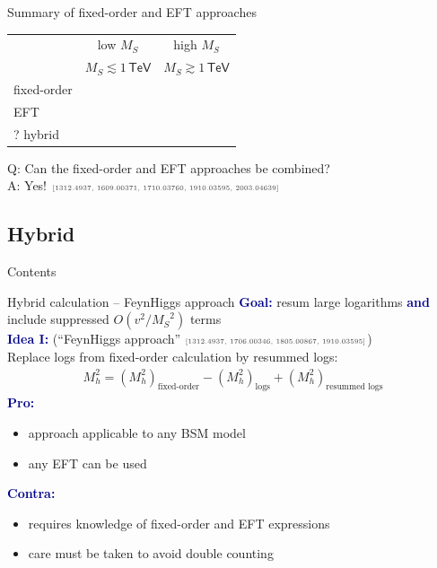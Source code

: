 \documentclass[hyperref={pdfpagelabels=false},ngerman]{beamer}
\newcommand{\cmark}{\ding{51}}%
\newcommand{\xmark}{\ding{55}}%
\newcommand{\eh}[1]{\,\mathsf{#1}}
\newcommand{\ok}{\textcolor{darkgreen}{\cmark}}
\newcommand{\notok}{\textcolor{red}{\xmark}}
\newcommand{\MS}{\ensuremath{M_S}}
\newcommand{\mycite}[1]{\ensuremath{\text{\textcolor{darkgray}{\tiny [#1]}}}}
\renewcommand{\emph}[1]{\textbf{\textcolor{darkblue}{#1}}}
\begin{document}
\begin{frame}{Summary of fixed-order and EFT approaches}
  \begin{center}
    \begin{tabular}{lcc}
      \toprule
                  & low $\MS$ & high $\MS$ \\
                  & $\MS \lesssim 1\eh{TeV}$ & $\MS \gtrsim 1\eh{TeV}$ \\
      \midrule
      fixed-order & \ok       & \notok     \\
      EFT         & \notok    & \ok        \\
      ? hybrid    & \ok       & \ok        \\
      \bottomrule
    \end{tabular}
  \end{center}
  \vspace{2em}
  Q: Can the fixed-order and EFT approaches be combined? \\[1em]
  A: Yes!  \mycite{1312.4937, 1609.00371, 1710.03760, 1910.03595, 2003.04639}
\end{frame}


\subsection{Hybrid}

\begin{frame}{Contents}
\end{frame}

\begin{frame}{Hybrid calculation -- FeynHiggs approach}
  \emph{Goal:} resum large logarithms \emph{and} include suppressed
  $O(v^2/\MS^2)$ terms
  \\[2em]
  \emph{Idea I:} (``FeynHiggs approach'' \mycite{1312.4937, 1706.00346, 1805.00867, 1910.03595})\\
  Replace logs from fixed-order calculation by resummed logs:
  \begin{align*}
    M_h^2 = (M_h^2)_{\text{fixed-order}} - (M_h^2)_{\text{logs}} + (M_h^2)_{\text{resummed logs}}
  \end{align*}
  \emph{Pro:}
  \begin{itemize}
  \item[\ok] approach applicable to any BSM model
  \item[\ok] any EFT can be used
  \end{itemize}
  \emph{Contra:}
  \begin{itemize}
  \item[\notok] requires knowledge of fixed-order and EFT expressions
  \item[\notok] care must be taken to avoid double counting
  \end{itemize}
\end{frame}
\end{document}
